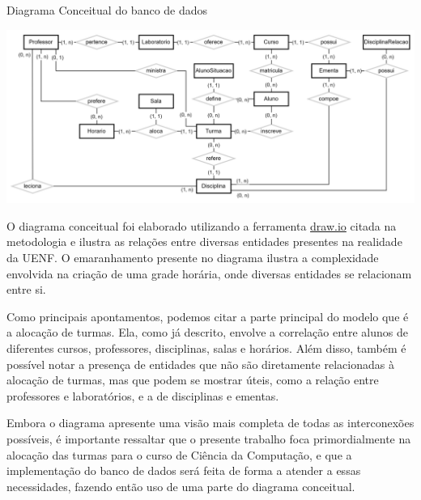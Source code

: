 \begin{MyCenteredFigure}
  \caption{Diagrama Conceitual do banco de dados}
  \label{fig:DiagramConceitual}
  \includegraphics[width=\textwidth]{files/img/DiagramaConceitual/DiagramaConceitualBranco}
\end{MyCenteredFigure} %

O diagrama conceitual foi elaborado utilizando a ferramenta \href{https://www.drawio.com/}{draw.io} citada na metodologia e ilustra as relações entre diversas entidades presentes na realidade da UENF. O emaranhamento presente no diagrama ilustra a complexidade envolvida na criação de uma grade horária, onde diversas entidades se relacionam entre si.

Como principais apontamentos, podemos citar a parte principal do modelo que é a alocação de turmas. Ela, como já descrito, envolve a correlação entre alunos de diferentes cursos, professores, disciplinas, salas e horários. Além disso, também é possível notar a presença de entidades que não são diretamente relacionadas à alocação de turmas, mas que podem se mostrar úteis, como a relação entre professores e laboratórios, e a de disciplinas e ementas.

Embora o diagrama apresente uma visão mais completa de todas as interconexões possíveis, é importante ressaltar que o presente trabalho foca primordialmente na alocação das turmas para o curso de Ciência da Computação, e que a implementação do banco de dados será feita de forma a atender a essas necessidades, fazendo então uso de uma parte do diagrama conceitual.



